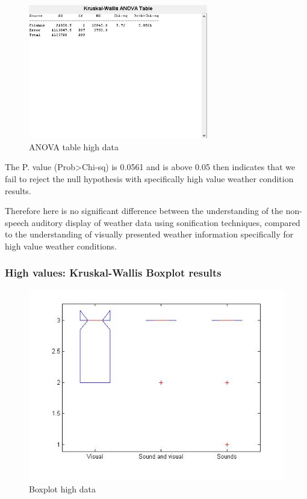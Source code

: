 \begin{figure}[!htbp]
    \centering
    \includegraphics[width=0.7\textwidth]{images/Evaluation6.jpg}
    \caption{ANOVA table high data}
    \label{fig:evaluation6}
\end{figure}

The P. value (Prob>Chi-sq) is 0.0561 and is above 0.05 then indicates that we fail to reject the null hypothesis with specifically high value weather condition results.

Therefore here is no significant difference between the understanding of the non-speech auditory display of weather data using sonification techniques, compared to the understanding of visually presented weather information specifically for high value weather conditions.


\FloatBarrier
\subsubsection*{High values: Kruskal-Wallis Boxplot results} %
\label{ssub:high_values_kruskal_wallis_boxplot_results}

\begin{figure}[!htbp]
    \centering
    \includegraphics[width=.7\textwidth]{images/Evaluation8.jpg}
    \caption{Boxplot high data}
    \label{fig:evaluation8}
\end{figure}

